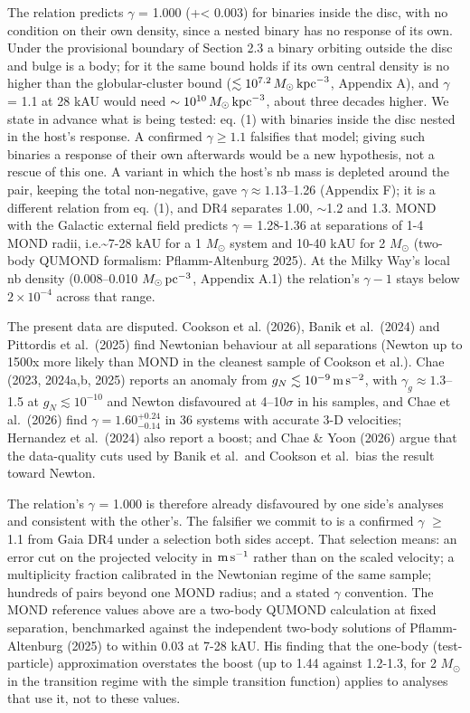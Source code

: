 \documentclass[
  10pt,
]{article}
\begin{document}
The relation predicts $\gamma$ = 1.000 (+\textless{} 0.003) for binaries inside the disc, with no condition on their own density, since a nested binary has no response of its own. Under the provisional boundary of Section 2.3 a binary orbiting outside the disc and bulge is a body; for it the same bound holds if its own central density is no higher than the globular-cluster bound ($\lesssim10^{7.2}\,M_\odot\,{\rm kpc}^{-3}$, Appendix A), and $\gamma$ = 1.1 at 28 kAU would need $\sim10^{10}\,M_\odot\,{\rm kpc}^{-3}$, about three decades higher. We state in advance what is being tested: eq. (1) with binaries inside the disc nested in the host's response. A confirmed $\gamma\ge1.1$ falsifies that model; giving such binaries a response of their own afterwards would be a new hypothesis, not a rescue of this one. A variant in which the host's nb mass is depleted around the pair, keeping the total non-negative, gave $\gamma\approx1.13$--1.26 (Appendix F); it is a different relation from eq. (1), and DR4 separates 1.00, $\sim$1.2 and 1.3. MOND with the Galactic external field predicts $\gamma$ = 1.28-1.36 at separations of 1-4 MOND radii, i.e.\textasciitilde{}7-28 kAU for a 1 $M_\odot$ system and 10-40 kAU for 2 $M_\odot$ (two-body QUMOND formalism: Pflamm-Altenburg 2025). At the Milky Way's local nb density (0.008--0.010 $M_\odot\,{\rm pc}^{-3}$, Appendix A.1) the relation's $\gamma-1$ stays below $2\times10^{-4}$ across that range.

The present data are disputed. Cookson et al. (2026), Banik et al.~(2024) and Pittordis et al.~(2025) find Newtonian behaviour at all separations (Newton up to 1500x more likely than MOND in the cleanest sample of Cookson et al.). Chae (2023, 2024a,b, 2025) reports an anomaly from $g_N\lesssim10^{-9}\,{\rm m\,s^{-2}}$, with $\gamma_g\approx1.3$--1.5 at $g_N\lesssim10^{-10}$ and Newton disfavoured at 4--10$\sigma$ in his samples, and Chae et al.~(2026) find $\gamma=1.60^{+0.24}_{-0.14}$ in 36 systems with accurate 3-D velocities; Hernandez et al.~(2024) also report a boost; and Chae \& Yoon (2026) argue that the data-quality cuts used by Banik et al.~and Cookson et al.~bias the result toward Newton.

The relation's $\gamma$ = 1.000 is therefore already disfavoured by one side's analyses and consistent with the other's. The falsifier we commit to is a confirmed $\gamma$ $\ge$ 1.1 from Gaia DR4 under a selection both sides accept. That selection means: an error cut on the projected velocity in ${\rm m\,s^{-1}}$ rather than on the scaled velocity; a multiplicity fraction calibrated in the Newtonian regime of the same sample; hundreds of pairs beyond one MOND radius; and a stated $\gamma$ convention. The MOND reference values above are a two-body QUMOND calculation at fixed separation, benchmarked against the independent two-body solutions of Pflamm-Altenburg (2025) to within 0.03 at 7-28 kAU. His finding that the one-body (test-particle) approximation overstates the boost (up to 1.44 against 1.2-1.3, for 2 $M_\odot$ in the transition regime with the simple transition function) applies to analyses that use it, not to these values.
\end{document}

